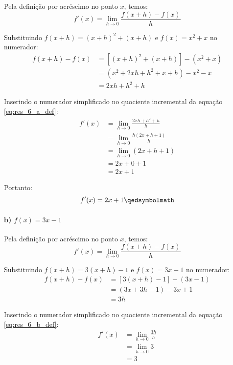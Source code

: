 Pela definição por acréscimo no ponto $x$, temos:
\begin{equation}
f'(x) = \lim_{h \to 0} \frac{f(x + h) - f(x)}{h} \label{eq:res_6_a_def}
\end{equation}

Substituindo $f(x + h) = (x + h)^2 + (x + h)$ e $f(x) = x^2 + x$ no numerador:
\begin{align*}
f(x + h) - f(x) &= \left[(x + h)^2 + (x + h)\right] - (x^2 + x) \\
&= \left(x^2 + 2xh + h^2 + x + h\right) - x^2 - x \\
&= 2xh + h^2 + h
\end{align*}

Inserindo o numerador simplificado no quociente incremental da equação \eqref{eq:res_6_a_def}:
\begin{align*}
f'(x) &= \lim_{h \to 0} \frac{2xh + h^2 + h}{h} \\
      &= \lim_{h \to 0} \frac{h(2x + h + 1)}{h} \\
      &= \lim_{h \to 0} (2x + h + 1) \\
      &= 2x + 0 + 1 \\
      &= 2x + 1
\end{align*}

Portanto:
\[
  f'(x) = 2x + 1 \qedsymbolmath
\]

\setcounter{equation}{0}
\paragraph{b) $f(x) = 3x - 1$}

Pela definição por acréscimo no ponto $x$, temos:
\begin{equation}
f'(x) = \lim_{h \to 0} \frac{f(x + h) - f(x)}{h} \label{eq:res_6_b_def}
\end{equation}

Substituindo $f(x + h) = 3(x + h) - 1$ e $f(x) = 3x - 1$ no numerador:
\begin{align*}
f(x + h) - f(x) &= [3(x + h) - 1] - (3x - 1) \\
&= (3x + 3h - 1) - 3x + 1 \\
&= 3h
\end{align*}

Inserindo o numerador simplificado no quociente incremental da equação \eqref{eq:res_6_b_def}:
\begin{align*}
f'(x) &= \lim_{h \to 0} \frac{3h}{h} \\
      &= \lim_{h \to 0} 3 \\
      &= 3
\end{align*}

